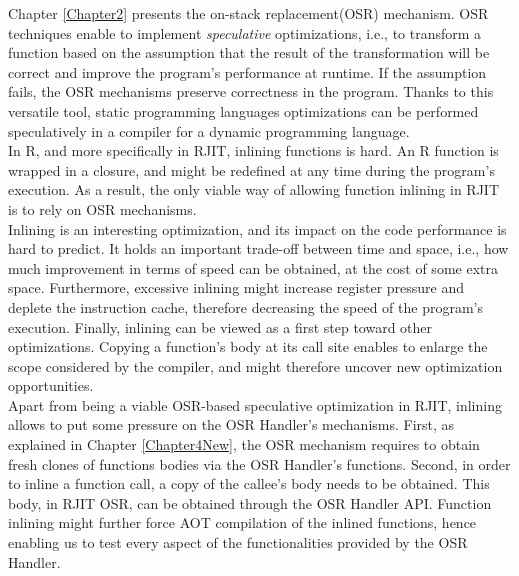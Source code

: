 Chapter \ref{Chapter2} presents the on-stack replacement(OSR) mechanism.
OSR techniques enable to implement \textit{speculative} optimizations, i.e., to transform a function based on the assumption that the result of the transformation will be correct and improve the program's performance at runtime.
If the assumption fails, the OSR mechanisms preserve correctness in the program.
Thanks to this versatile tool, static programming languages optimizations can be performed speculatively in a compiler for a dynamic programming language.\\

In R, and more specifically in RJIT, inlining functions is hard. 
An R function is wrapped in a closure, and might be redefined at any time during the program's execution.
As a result, the only viable way of allowing function inlining in RJIT is to rely on OSR mechanisms.\\

Inlining is an interesting optimization, and its impact on the code performance is hard to predict. 
It holds an important trade-off between time and space, i.e., how much improvement in terms of speed can be obtained, at the cost of some extra space.
Furthermore, excessive inlining might increase register pressure and deplete the instruction cache, therefore decreasing the speed of the program's execution.
Finally, inlining can be viewed as a first step toward other optimizations.
Copying a function's body at its call site enables to enlarge the scope considered by the compiler, and might therefore uncover new optimization opportunities.\\

Apart from being a viable OSR-based speculative optimization in RJIT, inlining allows to put some pressure on the OSR Handler's mechanisms.
First, as explained in Chapter \ref{Chapter4New}, the OSR mechanism requires to obtain fresh clones of functions bodies via the OSR Handler's functions.
Second, in order to inline a function call, a copy of the callee's body needs to be obtained.
This body, in RJIT OSR, can be obtained through the OSR Handler API.
Function inlining might further force AOT compilation of the inlined functions, hence enabling us to test every aspect of the functionalities provided by the OSR Handler.\\

